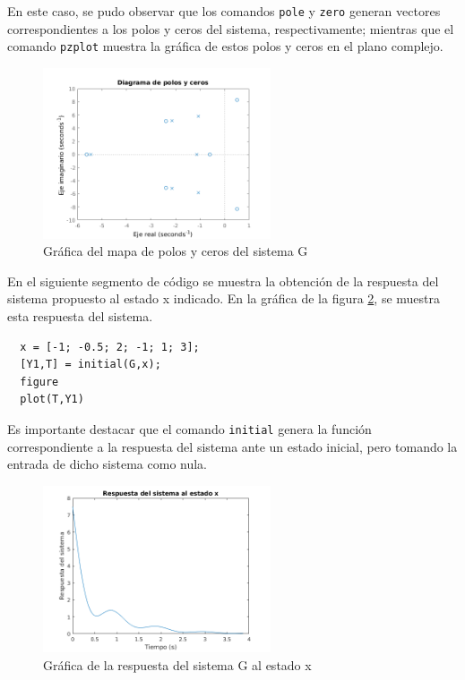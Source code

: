 \documentclass[12pt,letterpaper]{article}
\begin{document}
En este caso, se pudo observar que los comandos \texttt{pole} y \texttt{zero} generan vectores
correspondientes a los polos y ceros del sistema, respectivamente; mientras que el comando
\texttt{pzplot} muestra la gráfica de estos polos y ceros en el plano complejo.

\begin{figure}[ht!]
	\centering
	\includegraphics[width=0.6\textwidth]{pictures/Ejercicio5/diag_polos_ceros}
	\caption{Gráfica del mapa de polos y ceros del sistema G}
	\label{fig:diag_polos_ceros}
\end{figure} 



En el siguiente segmento de código se muestra la obtención de la respuesta del sistema propuesto al
estado x indicado. En la gráfica de la figura \ref{fig:respuesta_estado_x}, se muestra esta respuesta
del sistema.
\begin{lstlisting}[style=Matlab-editor, basicstyle=\mlttfamily]
  % Respuesta natural al estado x
  x = [-1; -0.5; 2; -1; 1; 3];
  [Y1,T] = initial(G,x);
  figure
  plot(T,Y1)
\end{lstlisting}

Es importante destacar que el comando \texttt{initial} genera la función correspondiente a la
respuesta del sistema ante un estado inicial, pero tomando la entrada de dicho sistema como nula. 

\begin{figure}[ht!]
	\centering
	\includegraphics[width=0.6\textwidth]{pictures/Ejercicio5/respuesta_estado_x}
	\caption{Gráfica de la respuesta del sistema G al estado x}
	\label{fig:respuesta_estado_x}
\end{figure} 
\end{document}
